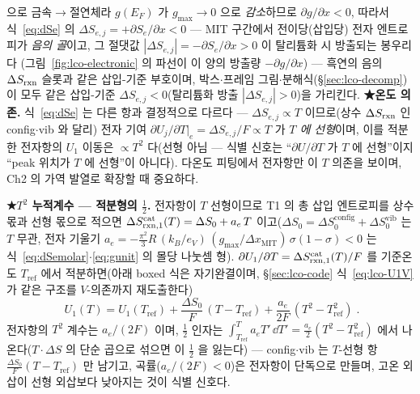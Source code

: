 으로 금속$\to$절연체라 $g(E_F)$ 가 $g_{\max}\!\to\!0$ 으로 \emph{감소}하므로 $\partial g/\partial x<0$, 따라서
식~\eqref{eq:dSe} 의 $\Delta S_{e,j}=+\partial S_e/\partial x<0$ --- MIT 구간에서 전이당(삽입당) 전자 엔트로피가
\emph{음의 골}이고, 그 절댓값 $|\Delta S_{e,j}|=-\partial S_e/\partial x>0$ 이 탈리튬화 시 방출되는 봉우리다
(그림~\ref{fig:lco-electronic} 의 파선이 이 양의 방출량 $-\partial g/\partial x$) --- 흑연의 음의 $\Delta S_{\mathrm{rxn}}$
슬롯과 같은 삽입-기준 부호이며, 박스$\cdot$프레임 그림$\cdot$분해식(\S\ref{sec:lco-decomp})이 모두 같은
삽입-기준 $\Delta S_{e,j}<0$(탈리튬화 방출 $|\Delta S_{e,j}|>0$)을 가리킨다. \textbf{★온도 의존.} 식~\eqref{eq:dSe} 는 다른 항과 결정적으로 다르다 --- $\Delta S_{e,j}\propto T$ 이므로(상수 $\Delta S_{\mathrm{rxn}}$ 인
config$\cdot$vib 와 달리) 전자 기여 $\partial U_j/\partial T|_e=\Delta S_{e,j}/F\propto T$ 가 \emph{$T$ 에 선형}이며,
이를 적분한 전자항의 $U_1$ 이동은 $\propto T^2$ 다(선형 아님 --- 식별 신호는 ``$\partial U/\partial T$ 가 $T$ 에
선형''이지 ``peak 위치가 $T$ 에 선형''이 아니다). 다온도 피팅에서 전자항만 이 $T$ 의존을 보이며, Ch2 의 가역
발열로 확장할 때 중요하다.

\textbf{★$T^2$ 누적계수 --- 적분형의 $\tfrac12$.} 전자항이 $T$ 선형이므로 T1 의 총 삽입 엔트로피를 상수 몫과 선형 몫으로 적으면
$\Delta S_{\mathrm{rxn},1}^\mathrm{cat}(T)=\Delta S_0+a_e\,T$ 이고($\Delta S_0=\Delta S_0^\mathrm{config}+
\Delta S_0^\mathrm{vib}$ 는 $T$ 무관, 전자 기울기 $a_e=-\tfrac{\pi^2}{3}R\,(k_B/e_V)\,(g_{\max}/
\Delta x_\mathrm{MIT})\,\sigma(1-\sigma)<0$ 는 식~\eqref{eq:dSemolar}$\cdot$\eqref{eq:gunit} 의 몰당 나눗셈 형).
$\partial U_1/\partial T=\Delta S_{\mathrm{rxn},1}^\mathrm{cat}(T)/F$ 를 기준온도 $T_\mathrm{ref}$ 에서 적분하면(아래 boxed 식은 자기완결이며, \S\ref{sec:lco-code} 식~\eqref{eq:lco-U1V} 가 같은 구조를 $V$-의존까지 재도출한다)
\begin{equation}
\boxed{\;U_1(T)=U_1(T_\mathrm{ref})+\frac{\Delta S_0}{F}\,(T-T_\mathrm{ref})+\frac{a_e}{2F}\,(T^2-T_\mathrm{ref}^2)\;.}
\label{eq:U1T2}
\end{equation}
전자항의 $T^2$ 계수는 $a_e/(2F)$ 이며, $\tfrac12$ 인자는 $\int_{T_\mathrm{ref}}^{T}a_e T'\,\dd T'=\tfrac{a_e}{2}
(T^2-T_\mathrm{ref}^2)$ 에서 나온다($T\cdot\Delta S$ 의 단순 곱으로 섞으면 이 $\tfrac12$ 을 잃는다) --- config$\cdot$vib 는
$T$-선형 항 $\tfrac{\Delta S_0}{F}(T-T_\mathrm{ref})$ 만 남기고, 곡률($a_e/(2F)<0$)은 전자항이 단독으로 만들며, 고온
외삽이 선형 외삽보다 낮아지는 것이 식별 신호다.

